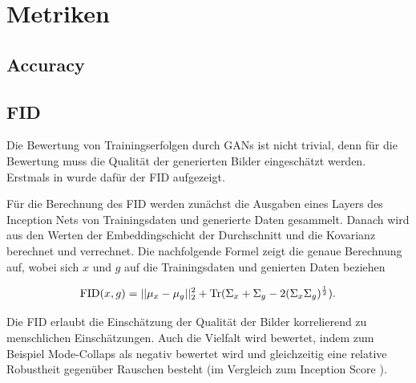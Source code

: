 \section{Metriken}
\subsection{Accuracy}
\subsection{FID}	
Die Bewertung von Trainingserfolgen durch GANs ist nicht trivial, denn für die Bewertung muss die Qualität der generierten Bilder eingeschätzt werden.
Erstmals in \cite{fid} wurde dafür der \acrfull{FID} aufgezeigt.

Für die Berechnung des \acrshort{FID} werden zunächst die Ausgaben eines Layers des Inception Nets von Trainingsdaten und generierte Daten gesammelt.
Danach wird aus den Werten der Embeddingschicht der Durchschnitt und die Kovarianz berechnet und verrechnet.
Die nachfolgende Formel \cite{are-gans-created-equally} zeigt die genaue Berechnung auf, wobei sich $x$ und $g$ auf die Trainingsdaten und genierten Daten beziehen

\begin{equation}
	\operatorname{FID}(x, g) = ||\mu_x - \mu_g||_2^2 + \operatorname{Tr}(\Sigma_x + \Sigma_g - 2(\Sigma_x \Sigma_g)^{\frac{1}{2}}).
\end{equation}

Die \acrshort{FID} erlaubt die Einschätzung der Qualität der Bilder korrelierend zu menschlichen Einschätzungen.
Auch die Vielfalt wird bewertet, indem zum Beispiel Mode-Collaps als negativ bewertet wird und gleichzeitig eine relative Robustheit gegenüber Rauschen besteht (im Vergleich zum Inception Score \cite{are-gans-created-equally}). 

